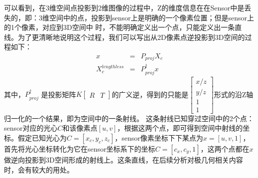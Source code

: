 可以看到，在3维空间点投影到2维图像的过程中，Z的维度信息在在Sensor中是丢失的，即：3维空间中的点，投影到sensor上是明确的一个像素位置；但是sensor上的1个像素，对应到3D空间中
时，不能明确定义出一个点，只能定义出一条直线。为了更清晰地说明这个过程，我们可以写出从2D像素点逆投影到3D空间的过程如下：
\[
\begin{array}{ccc} x&=& P_{proj}X_c \\ X_c^{length less} & = &P_{proj}^\dagger x \end{array}
\]
其中，$P_{proj}^\dagger$ 是投影矩阵$K \left[ \begin{array}{c|c} R & T \end{array}\right] $的广义逆，得到的只能是$\left[ \begin{array}{c} x/z \\y/z\\1\\1\end{array} \right]$形式的沿Z轴归一化的一个结果，即为空间中的一条射线。
这条射线已知穿过空间中的2个点：sensor对应的光心$C$和该像素点$[u , v]$，根据这两个点，即可得到空间中射线的坐标。假定已知光心为$C=[x_c, y_c, z_c]$，sensor像素坐标下下某点为$x=[u ,v, 1]$，首先将光心坐标转化为它在sensor坐标系下的坐标$C = [c_x, c_y , 1]$，这两个点都在$x$做逆向投影到3D空间形成的射线上。这条直线，在后续分析对极几何相关内容时，会有较大的用处。
